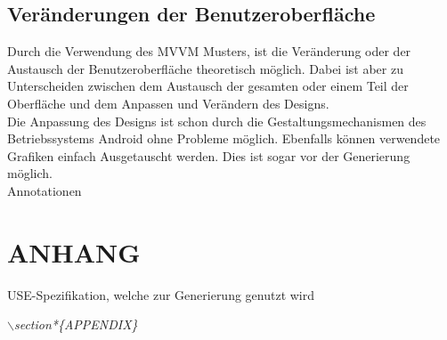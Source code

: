 \documentclass[a4paper,twoside]{article}
\begin{document}
\subsection{Veränderungen der Benutzeroberfläche}
Durch die Verwendung des MVVM Musters, ist die Veränderung oder der Austausch der Benutzeroberfläche theoretisch möglich. Dabei ist aber zu Unterscheiden zwischen dem Austausch der gesamten oder einem Teil der Oberfläche und dem Anpassen und Verändern des Designs.\\
Die Anpassung des Designs ist schon durch die Gestaltungsmechanismen des Betriebssystems Android ohne Probleme möglich. Ebenfalls können verwendete Grafiken einfach Ausgetauscht werden. Dies ist sogar vor der Generierung möglich.\\


Annotationen 
\vfill

{\small
}

\section*{\uppercase{Anhang}}

\noindent 
USE-Spezifikation, welche zur Generierung genutzt wird

\textit{$\backslash$section*\{APPENDIX\}}


\vfill
\end{document}
